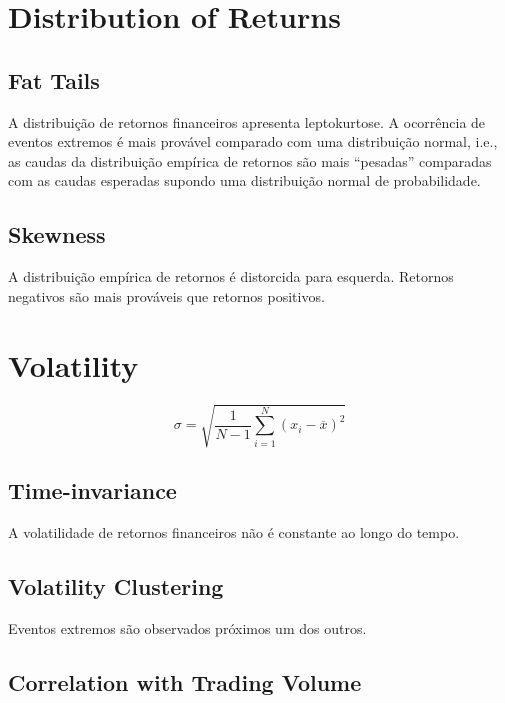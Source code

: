 \documentclass[]{book}
\begin{document}
\section{Distribution of Returns}\label{distribution-of-returns}

\subsection{Fat Tails}\label{fat-tails}

A distribuição de retornos financeiros apresenta leptokurtose. A
ocorrência de eventos extremos é mais provável comparado com uma
distribuição normal, i.e., as caudas da distribuição empírica de
retornos são mais ``pesadas'' comparadas com as caudas esperadas supondo
uma distribuição normal de probabilidade.

\subsection{Skewness}\label{skewness}

A distribuição empírica de retornos é distorcida para esquerda. Retornos
negativos são mais prováveis que retornos positivos.

\section{Volatility}\label{volatility}

\begin{equation}
 \sigma = \sqrt{ \frac{1}{N-1} \sum_{i=1}^N (x_i - \overline{x})^2}
\label{eq:sd}
\end{equation}

\subsection{Time-invariance}\label{time-invariance}

A volatilidade de retornos financeiros não é constante ao longo do
tempo.

\subsection{Volatility Clustering}\label{volatility-clustering}

Eventos extremos são observados próximos um dos outros.

\subsection{Correlation with Trading
Volume}\label{correlation-with-trading-volume}
\end{document}
